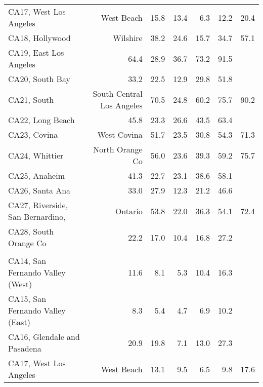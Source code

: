\begin{longtable}[l]{l|rrrrr}
\hspace{1em}CA17, West Los Angeles & West Beach & 15.8 & 13.4 & 6.3 & 12.2 & 20.4\\
\hspace{1em}CA18, Hollywood & Wilshire & 38.2 & 24.6 & 15.7 & 34.7 & 57.1\\
\hspace{1em}CA19, East Los Angeles & 64.4 & 28.9 & 36.7 & 73.2 & 91.5\\
\hspace{1em}CA20, South Bay & 33.2 & 22.5 & 12.9 & 29.8 & 51.8\\
\hspace{1em}CA21, South & South Central Los Angeles & 70.5 & 24.8 & 60.2 & 75.7 & 90.2\\
\hspace{1em}CA22, Long Beach & 45.8 & 23.3 & 26.6 & 43.5 & 63.4\\
\hspace{1em}CA23, Covina & West Covina & 51.7 & 23.5 & 30.8 & 54.3 & 71.3\\
\hspace{1em}CA24, Whittier & North Orange Co & 56.0 & 23.6 & 39.3 & 59.2 & 75.7\\
\hspace{1em}CA25, Anaheim & 41.3 & 22.7 & 23.1 & 38.6 & 58.1\\
\hspace{1em}CA26, Santa Ana & 33.0 & 27.9 & 12.3 & 21.2 & 46.6\\
\hspace{1em}CA27, Riverside, San Bernardino, & Ontario & 53.8 & 22.0 & 36.3 & 54.1 & 72.4\\
\hspace{1em}CA28, South Orange Co & 22.2 & 17.0 & 10.4 & 16.8 & 27.2\\
\addlinespace[0.5em]
\\
\hspace{1em}CA14, San Fernando Valley (West) & 11.6 & 8.1 & 5.3 & 10.4 & 16.3\\
\hspace{1em}CA15, San Fernando Valley (East) & 8.3 & 5.4 & 4.7 & 6.9 & 10.2\\
\hspace{1em}CA16, Glendale and Pasadena & 20.9 & 19.8 & 7.1 & 13.0 & 27.3\\
\hspace{1em}CA17, West Los Angeles & West Beach & 13.1 & 9.5 & 6.5 & 9.8 & 17.6\\

\end{longtable}
